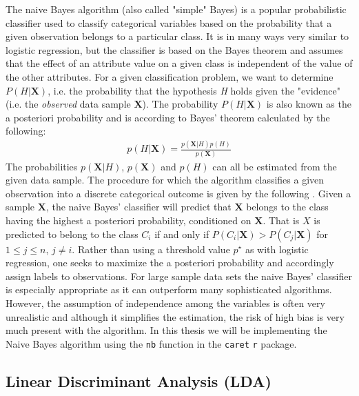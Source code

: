 \documentclass[../thesis.tex]{subfiles}
\begin{document}
\noindent The naive Bayes algorithm (also called "simple" Bayes) is a popular probabilistic classifier used to classify categorical variables based on the probability that a given observation belongs to a particular class. It is in many ways very similar to logistic regression, but the classifier is based on the Bayes theorem and assumes that the effect of an attribute value on a given class is independent of the value of the other attributes. For a given classification problem, we want to determine $P(H | \boldsymbol{X})$, i.e. the probability that the hypothesis \textit{H} holds given the "evidence" (i.e. the \textit{observed} data sample $\boldsymbol{X}$). The probability $P(H | \boldsymbol{X})$ is also known as the a posteriori probability and is according to Bayes' theorem calculated by the following:
\begin{align}
    p(H | \boldsymbol{X}) = \frac{p(\boldsymbol{X}|H) p(H)}{p(\boldsymbol{X})} 
\end{align}
\noindent The probabilities $p(\boldsymbol{X}|H)$, $p(\boldsymbol{X})$ and $p(H)$ can all be estimated from the given data sample. The procedure for which the algorithm classifies a given observation into a discrete categorical outcome is given by the following \citep{leung2007naive}. Given a sample $\boldsymbol{X}$, the naive Bayes' classifier will predict that $\boldsymbol{X}$ belongs to the class having the highest a posteriori probability, conditioned on $\boldsymbol{X}$. That is $X$ is predicted to belong to the class $C_i$ if and only if $P(C_i| \boldsymbol{X}) > P(C_j | \boldsymbol{X})$ for $1 \leq j \leq n$, $j \neq i$. Rather than using a threshold value $p^\star$ as with logistic regression, one seeks to maximize the a posteriori probability and accordingly assign labels to observations. For large sample data sets the naive Bayes' classifier is especially appropriate as it can outperform many sophisticated algorithms. However, the assumption of independence among the variables is often very unrealistic and although it simplifies the estimation, the risk of high bias is very much present with the algorithm. In this thesis we will be implementing the Naive Bayes algorithm using the \texttt{nb} function in the \texttt{caret}\citep{kuhncaret} \texttt{r} package.

\subsection{Linear Discriminant Analysis (LDA)}
\label{subsec:lda}
\end{document}
